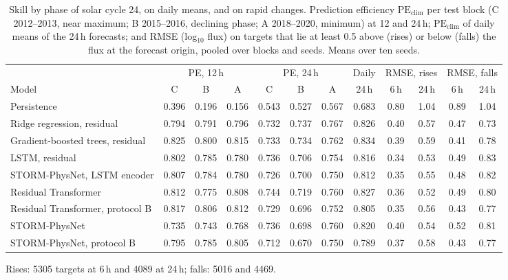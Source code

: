 \begin{table}[!t]
\centering
\caption{Skill by phase of solar cycle 24, on daily means, and on rapid changes. Prediction efficiency
\(\mathrm{PE}_{\mathrm{clim}}\) per test block (C 2012--2013, near maximum; B 2015--2016, declining phase; A
2018--2020, minimum) at 12 and 24\,h; \(\mathrm{PE}_{\mathrm{clim}}\) of daily means of the 24\,h forecasts; and RMSE
(log\(_{10}\) flux) on targets that lie at least 0.5 above (rises) or below (falls) the flux at the forecast origin,
pooled over blocks and seeds. Means over ten seeds.}
\label{tab:extra}
\footnotesize
\setlength{\tabcolsep}{4pt}
\begin{adjustbox}{max width=\linewidth}
\begin{tabular}{lccccccccccc}
\toprule
 & \multicolumn{3}{c}{PE, 12\,h} & \multicolumn{3}{c}{PE, 24\,h} & Daily & \multicolumn{2}{c}{RMSE, rises} & \multicolumn{2}{c}{RMSE, falls} \\
Model & C & B & A & C & B & A & 24\,h & 6\,h & 24\,h & 6\,h & 24\,h \\
\midrule
Persistence & 0.396 & 0.196 & 0.156 & 0.543 & 0.527 & 0.567 & 0.683 & 0.80 & 1.04 & 0.89 & 1.04 \\
Ridge regression, residual & 0.794 & 0.791 & 0.796 & 0.732 & 0.737 & 0.767 & 0.826 & 0.40 & 0.57 & 0.47 & 0.73 \\
Gradient-boosted trees, residual & 0.825 & 0.800 & 0.815 & 0.733 & 0.734 & 0.762 & 0.834 & 0.39 & 0.59 & 0.41 & 0.78 \\
LSTM, residual & 0.802 & 0.785 & 0.780 & 0.736 & 0.706 & 0.754 & 0.816 & 0.34 & 0.53 & 0.49 & 0.83 \\
STORM-PhysNet, LSTM encoder & 0.807 & 0.784 & 0.780 & 0.726 & 0.700 & 0.750 & 0.812 & 0.35 & 0.55 & 0.48 & 0.82 \\
Residual Transformer & 0.812 & 0.775 & 0.808 & 0.744 & 0.719 & 0.760 & 0.827 & 0.36 & 0.52 & 0.49 & 0.80 \\
Residual Transformer, protocol B & 0.817 & 0.806 & 0.812 & 0.729 & 0.696 & 0.752 & 0.805 & 0.35 & 0.56 & 0.43 & 0.77 \\
STORM-PhysNet & 0.735 & 0.743 & 0.768 & 0.736 & 0.698 & 0.760 & 0.820 & 0.40 & 0.54 & 0.52 & 0.81 \\
STORM-PhysNet, protocol B & 0.795 & 0.785 & 0.805 & 0.712 & 0.670 & 0.750 & 0.789 & 0.37 & 0.58 & 0.43 & 0.77 \\
\bottomrule
\end{tabular}
\end{adjustbox}

\smallskip
{\footnotesize Rises: 5305 targets at 6\,h and 4089 at 24\,h; falls: 5016 and 4469.}
\end{table}

